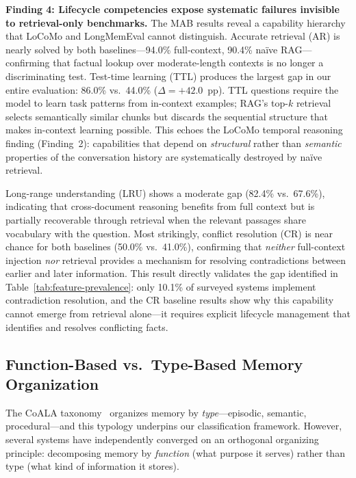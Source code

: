 \smallskip
\noindent\textbf{Finding 4: Lifecycle competencies expose systematic
failures invisible to retrieval-only benchmarks.}\enspace
The MAB results reveal a capability hierarchy that LoCoMo and LongMemEval
cannot distinguish.  Accurate retrieval (AR) is nearly solved by both
baselines---94.0\% full-context, 90.4\% na\"ive RAG---confirming that
factual lookup over moderate-length contexts is no longer a discriminating
test.  Test-time learning (TTL) produces the largest gap in our entire
evaluation: 86.0\% vs.\ 44.0\% ($\Delta = +42.0$~pp).  TTL questions
require the model to learn task patterns from in-context examples; RAG's
top-$k$ retrieval selects semantically similar chunks but discards the
sequential structure that makes in-context learning possible.  This echoes
the LoCoMo temporal reasoning finding (Finding~2): capabilities that
depend on \emph{structural} rather than \emph{semantic} properties of the
conversation history are systematically destroyed by na\"ive retrieval.

Long-range understanding (LRU) shows a moderate gap (82.4\% vs.\ 67.6\%),
indicating that cross-document reasoning benefits from full context but is
partially recoverable through retrieval when the relevant passages share
vocabulary with the question.  Most strikingly, conflict resolution (CR)
is near chance for both baselines (50.0\% vs.\ 41.0\%), confirming that
\emph{neither} full-context injection \emph{nor} retrieval provides a
mechanism for resolving contradictions between earlier and later
information.  This result directly validates the gap identified in
Table~\ref{tab:feature-prevalence}: only 10.1\% of surveyed systems
implement contradiction resolution, and the CR baseline results show why
this capability cannot emerge from retrieval alone---it requires explicit
lifecycle management that identifies and resolves conflicting facts.

\subsection{Function-Based vs.\ Type-Based Memory Organization}
\label{sec:function-vs-type}

The CoALA taxonomy~\cite{sumers2024coala} organizes memory by
\emph{type}---episodic, semantic, procedural---and this typology
underpins our classification framework.  However, several systems have
independently converged on an orthogonal organizing principle:
decomposing memory by \emph{function} (what purpose it serves) rather
than type (what kind of information it stores).

